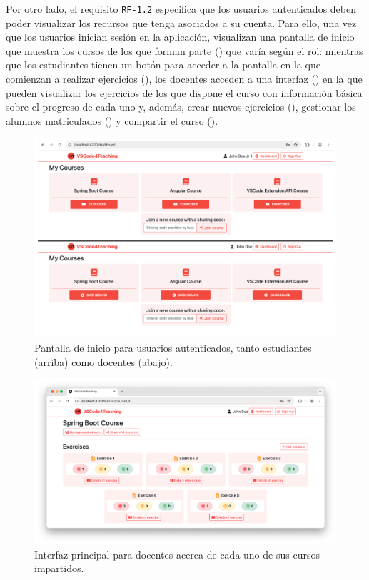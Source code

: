 Por otro lado, el requisito \texttt{RF-1.2} especifica que los usuarios autenticados deben poder visualizar los recursos que tenga asociados a su cuenta. Para ello, una vez que los usuarios inician sesión en la aplicación, visualizan una pantalla de inicio que muestra los cursos de los que forman parte () que varía según el rol: mientras que los estudiantes tienen un botón para acceder a la pantalla en la que comienzan a realizar ejercicios (), los docentes acceden a una interfaz () en la que pueden visualizar los ejercicios de los que dispone el curso con información básica sobre el progreso de cada uno y, además, crear nuevos ejercicios (), gestionar los alumnos matriculados () y compartir el curso ().

\begin{figure}[ht]
    \centering
    \includegraphics[width=\textwidth]{imagenes/utilizadas/4-3-implementacion/rf1-2.png}
    \caption{Pantalla de inicio para usuarios autenticados, tanto estudiantes (arriba) como docentes (abajo).}
    \label{fig:reqf1-2}
\end{figure}

\begin{figure}[ht]
    \centering
    \includegraphics[width=\textwidth]{imagenes/utilizadas/4-3-implementacion/rf1-3.png}
    \caption{Interfaz principal para docentes acerca de cada uno de sus cursos impartidos.}
    \label{fig:reqf1-3}
\end{figure}
